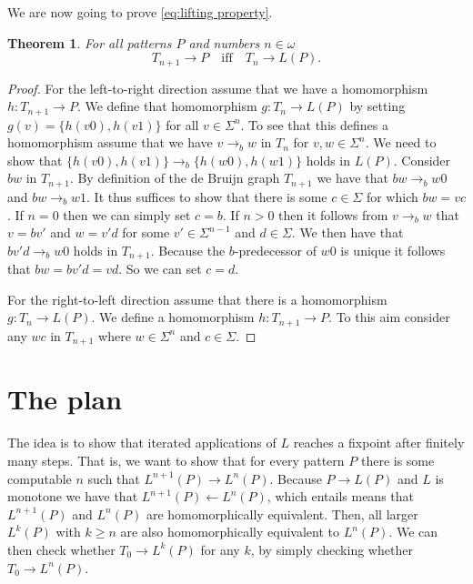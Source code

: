 \documentclass[a4paper]{article}
\renewcommand{\iff}{\quad \mbox{iff} \quad}
\newtheorem{theorem}{Theorem}
\begin{document}
We are now going to prove \eqref{eq:lifting property}.
\begin{theorem}
 For all patterns $P$ and numbers $n \in \omega$  
\begin{equation*}
 T_{n + 1} \to P \iff T_n \to L(P).
\end{equation*}
\end{theorem}
\begin{proof}
 For the left-to-right direction assume that we have a homomorphism $h :
T_{n + 1} \to P$. We define that homomorphism $g : T_n \to L(P)$ by
setting $g(v) = \{h(v0),h(v1)\}$ for all $v \in \Sigma^n$. To see that
this defines a homomorphism assume that we have $v \rightarrow_b w$ in
$T_n$ for $v,w \in \Sigma^n$. We need to show that $\{h(v0),h(v1)\}
\rightarrow_b \{h(w0),h(w1)\}$ holds in $L(P)$. Consider $bw$ in $T_{n +
1}$. By definition of the de Bruijn graph $T_{n + 1}$ we have that $bw
\rightarrow_b w0$ and $bw \rightarrow_b w1$. It thus suffices to show
that there is some $c \in \Sigma$ for which $bw = vc$. If $n = 0$ then
we can simply set $c = b$. If $n > 0$ then it follows from $v
\rightarrow_b w$ that $v = b v'$ and $w = v' d$ for some $v' \in
\Sigma^{n - 1}$ and $d \in \Sigma$. We then have that $b v' d
\rightarrow_b w 0$ holds in $T_{n + 1}$. Because the $b$-predecessor of
$w 0$ is unique it follows that $b w = b v' d = v d$. So we can set $c =
d$.

 For the right-to-left direction assume that there is a homomorphism $g :
T_n \to L(P)$. We define a homomorphism $h : T_{n + 1} \to P$. To this
aim consider any $w c$ in $T_{n + 1}$ where $w \in \Sigma^n$ and $c \in
\Sigma$.

\end{proof}


\section{The plan}

The idea is to show that iterated applications of $L$ reaches a fixpoint
after finitely many steps. That is, we want to show that for every
pattern $P$ there is some computable $n$ such that $L^{n + 1}(P) \to
L^n(P)$. Because $P \to L(P)$ and $L$ is monotone we have that $L^{n +
1}(P) \leftarrow L^n(P)$, which entails means that $L^{n + 1} (P)$ and
$L^n(P)$ are homomorphically equivalent. Then, all larger $L^k(P)$ with
$k \geq n$ are also homomorphically equivalent to $L^n(P)$. We can then
check whether $T_0 \to L^k(P)$ for any $k$, by simply checking whether
$T_0 \to L^n(P)$.
\end{document}
